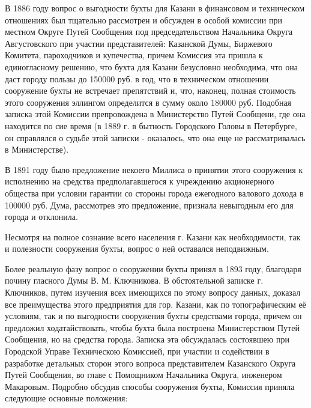 \documentclass[oneside,final,14pt]{extreport}
\begin{document}
	В 1886 году вопрос о выгодности бухты для Казани в финансовом и техническом отношениях был тщательно рассмотрен и обсужден в особой комиссии при местном Округе Путей Сообщения под председательством Начальника Округа Августовского при участии представителей: Казанской Думы, Биржевого Комитета, пароходчиков и купечества, причем Комиссия эта пришла к единогласному решению, что бухта для Казани безусловно необходима, что она даст городу пользы до 150000 руб. в год, что в техническом отношении сооружение бухты не встречает препятствий и, что, наконец,  полная стоимость этого сооружения эллингом определится в сумму около 180000 руб. Подобная записка этой Комиссии препровождена в Министерство Путей Сообщени, где она находится по сие время (в 1889 г. в бытность Городского Головы в Петербурге, он справлялся о судьбе этой записки - оказалось, что она еще не рассматривалась в Министерстве). 
	
	В 1891 году было предложение некоего Миллиса о принятии этого сооружения к исполнению на средства предполагавшегося к учреждению акционерного общества при условии гарантии со стороны города ежегодного валового дохода в 100000 руб. Дума, рассмотрев это предложение, признала невыгодным его для города и отклонила.
	
	Несмотря на полное сознание всего населения г. Казани как необходимости, так и полезности сооружения бухты, вопрос о ней оставался неподвижным.
	
	Более реальную фазу вопрос о сооружении бухты принял в 1893 году, благодаря почину гласного Думы В. М. Ключникова. В обстоятельной записке г. Ключников, путем изучения всех имеющихся по этому вопросу данных, доказал все преимущества этого предприятия для гор. Казани, как по топографическим её условиям, так и по выгодности сооружения бухты средствами города, причем он предложил ходатайствовать, чтобы бухта была построена Министерством Путей Сообщения, но на средства города. Записка эта обсуждалась состоявшею при Городской Управе Техническою Комиссией, при участии и содействии в разработке детальных сторон этого вопроса представителем Казанского Округа Путей Сообщения, во главе с Помощником Начальника Округа, инженером Макаровым. Подробно обсудив способы сооружения бухты, Комиссия приняла следующие основные положения: 
	
\end{document}
